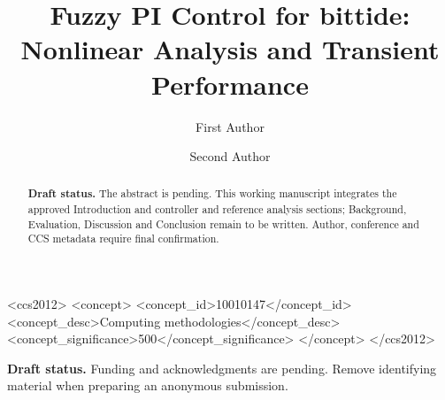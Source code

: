 \documentclass[sigconf]{acmart}
\begin{document}
\title[Fuzzy PI Control for bittide]{Fuzzy PI Control for bittide: Nonlinear Analysis and Transient Performance}

\author{First Author}

\author{Second Author}

\renewcommand{\shortauthors}{First Author and Second Author}

\begin{abstract}
\textbf{Draft status.} The abstract is pending. This working manuscript
integrates the approved Introduction and controller and reference analysis
sections; Background, Evaluation, Discussion and Conclusion remain to be
written. Author, conference and CCS metadata require final confirmation.
\end{abstract}


\begin{CCSXML}
<ccs2012>
 <concept>
  <concept_id>10010147</concept_id>
  <concept_desc>Computing methodologies</concept_desc>
  <concept_significance>500</concept_significance>
 </concept>
</ccs2012>
\end{CCSXML}

\maketitle









\begin{acks}
\textbf{Draft status.} Funding and acknowledgments are pending. Remove
identifying material when preparing an anonymous submission.
\end{acks}



\end{document}
